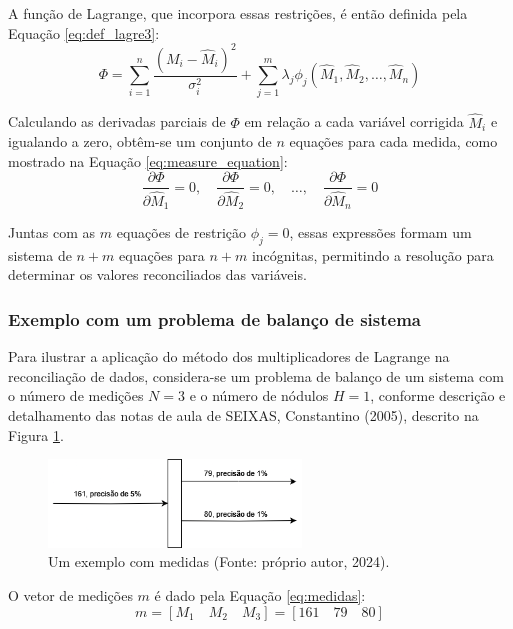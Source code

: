 A função de Lagrange, que incorpora essas restrições, é então definida pela Equação \ref{eq:def_lagre3}:
\begin{equation}
	\Phi = \sum_{i=1}^n \frac{(M_i - \hat{M}_i)^2}{\sigma_i^2} + \sum_{j=1}^m \lambda_j \phi_j(\hat{M}_1, \hat{M}_2, \dots, \hat{M}_n)
     \label{eq:def_lagre3}
\end{equation}

Calculando as derivadas parciais de $\Phi$ em relação a cada variável corrigida $\hat{M}_i$ e igualando a zero, obtêm-se um conjunto de $n$ equações para cada medida, como mostrado na Equação \ref{eq:measure_equation}:
\begin{equation}
	\frac{\partial \Phi}{\partial \hat{M}_1} = 0, \quad \frac{\partial \Phi}{\partial \hat{M}_2} = 0, \quad \dots, \quad \frac{\partial \Phi}{\partial \hat{M}_n} = 0
     \label{eq:measure_equation}
\end{equation}

Juntas com as $m$ equações de restrição $\phi_j = 0$, essas expressões formam um sistema de $n + m$ equações para $n + m$ incógnitas, permitindo a resolução para determinar os valores reconciliados das variáveis.

\subsubsection{Exemplo com um problema de balanço de sistema}
Para ilustrar a aplicação do método dos multiplicadores de Lagrange na reconciliação de dados, considera-se um problema de balanço de um sistema com o número de medições \(N = 3\) e o número de nódulos \(H = 1\), conforme descrição e detalhamento das notas de aula de SEIXAS, Constantino (2005), descrito na Figura \ref{Fig:ExemploImage}.

\begin{figure}[htbp]
    \centering
    \includegraphics[width=0.6\textwidth]{figuras/exemplo-problema.png}
    \caption{Um exemplo com medidas (Fonte: próprio autor, 2024).}
    \label{Fig:ExemploImage}
\end{figure}

O vetor de medições \(m\) é dado pela Equação \eqref{eq:medidas}:
\begin{equation}
    m = [M_1 \quad M_2 \quad M_3] = [161 \quad 79 \quad 80]
    \label{eq:medidas}
\end{equation}

